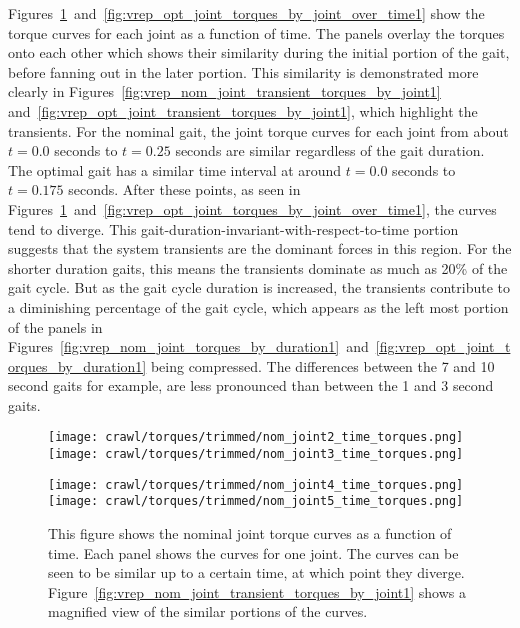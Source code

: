 Figures~\ref{fig:vrep_nom_joint_torques_by_joint_over_time1}~and~\ref{fig:vrep_opt_joint_torques_by_joint_over_time1}
show the torque curves for each joint as a function of time.
The panels overlay the torques onto each other
which shows their similarity during the initial portion of the gait, before fanning out
in the later portion.
This similarity is demonstrated more clearly in Figures~\ref{fig:vrep_nom_joint_transient_torques_by_joint1}
and~\ref{fig:vrep_opt_joint_transient_torques_by_joint1}, which highlight the transients.
For the nominal gait, the joint torque curves for each joint from about $t = 0.0$ seconds to $t = 0.25$ seconds
are similar regardless of the gait duration. The optimal gait has a similar time interval
at around $t = 0.0$ seconds to $t = 0.175$ seconds. After these points, as seen in
Figures~\ref{fig:vrep_nom_joint_torques_by_joint_over_time1}~and~\ref{fig:vrep_opt_joint_torques_by_joint_over_time1},
the curves tend to diverge.
This gait-duration-invariant-with-respect-to-time portion suggests that the system transients are the dominant
forces in this region. For the shorter duration gaits, this means the transients dominate as much as
20\% of the gait cycle. But as the gait cycle duration is increased, the transients
contribute to a diminishing percentage of the gait cycle, which appears as the left most
portion of the panels in Figures~\ref{fig:vrep_nom_joint_torques_by_duration1}~and~\ref{fig:vrep_opt_joint_torques_by_duration1}
being compressed. 
The differences between the 7 and 10 second gaits for example,
are less pronounced than between the 1 and 3 second gaits.

\begin{figure}
\centering
\texttt{[image: crawl/torques/trimmed/nom\_joint2\_time\_torques.png]}
\texttt{[image: crawl/torques/trimmed/nom\_joint3\_time\_torques.png]}

\centering
\texttt{[image: crawl/torques/trimmed/nom\_joint4\_time\_torques.png]}
\texttt{[image: crawl/torques/trimmed/nom\_joint5\_time\_torques.png]}

\caption{This figure shows the nominal joint torque curves as a function of time.
         Each panel shows the curves for one joint. The curves can be seen to be similar
         up to a certain time, at which point they diverge. 
         Figure~\ref{fig:vrep_nom_joint_transient_torques_by_joint1} shows a magnified
         view of the similar portions of the curves.}
\label{fig:vrep_nom_joint_torques_by_joint_over_time1}
\end{figure}

